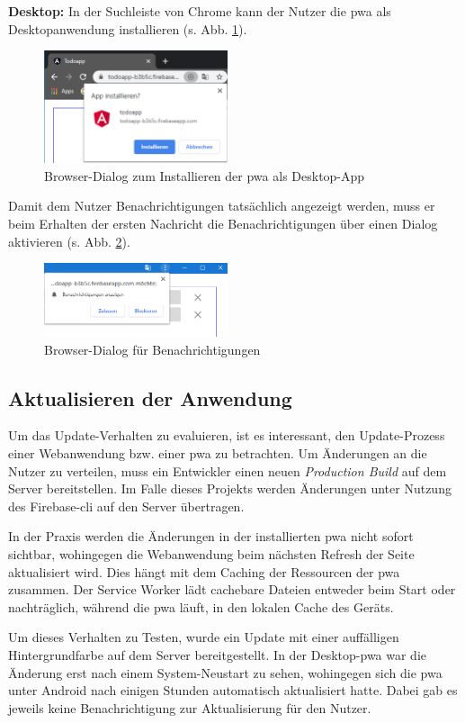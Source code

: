 \textbf{Desktop:}
In der Suchleiste von Chrome kann der Nutzer die \ac{pwa} als Desktopanwendung installieren (s. Abb. \ref{fig:dialog_install_pwa_desktop}).
\begin{figure}[h!]
	\centering
	\includegraphics[width=0.48\textwidth]{img/add_to_desktop_2.PNG}
	\caption{Browser-Dialog zum Installieren der \ac{pwa} als Desktop-App}
	\label{fig:dialog_install_pwa_desktop}
\end{figure}

Damit dem Nutzer Benachrichtigungen tatsächlich angezeigt werden, muss er beim Erhalten der ersten Nachricht die Benachrichtigungen über einen Dialog aktivieren (s. Abb. \ref{fig:pwa_benachrichtigungen_zulassen}).
\begin{figure}[h!]	
	\includegraphics[width=0.48\textwidth]{img/berechtigungen_zulassen.PNG}
	\centering
	\caption{Browser-Dialog für Benachrichtigungen}
	\label{fig:pwa_benachrichtigungen_zulassen}
\end{figure}

\subsection{Aktualisieren der Anwendung}

Um das Update-Verhalten zu evaluieren, ist es interessant, den Update-Prozess einer Webanwendung bzw. einer \ac{pwa} zu betrachten. Um Änderungen an die Nutzer zu verteilen, muss ein Entwickler einen neuen \textit{Production Build} auf dem Server bereitstellen. Im Falle dieses Projekts werden Änderungen unter Nutzung des Firebase-\ac{cli} auf den Server übertragen.

In der Praxis werden die Änderungen in der installierten \ac{pwa} nicht sofort sichtbar, wohingegen die Webanwendung beim nächsten Refresh der Seite aktualisiert wird. Dies hängt mit dem Caching der Ressourcen der \ac{pwa} zusammen. Der Service Worker lädt cachebare Dateien entweder beim Start oder nachträglich, während die \ac{pwa} läuft, in den lokalen Cache des Geräts.

Um dieses Verhalten zu Testen, wurde ein Update mit einer auffälligen Hintergrundfarbe auf dem Server bereitgestellt. In der Desktop-\ac{pwa} war die Änderung erst nach einem System-Neustart zu sehen, wohingegen sich die \ac{pwa} unter Android nach einigen Stunden automatisch aktualisiert hatte. Dabei gab es jeweils keine Benachrichtigung zur Aktualisierung für den Nutzer.






